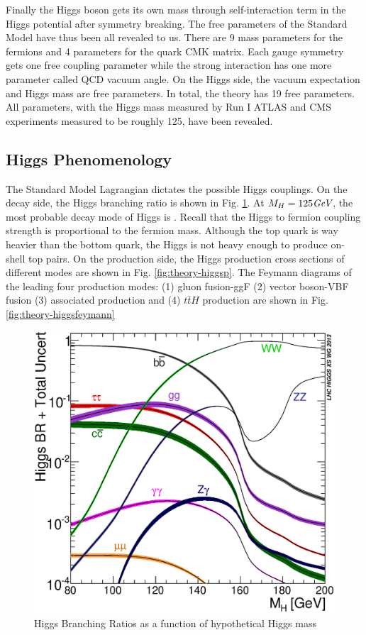Finally the Higgs boson gets its own mass through self-interaction term in the Higgs potential after symmetry breaking. The free parameters of the Standard Model have thus been all revealed to us. There are 9 mass parameters for the fermions and 4 parameters for the quark CMK matrix. Each gauge symmetry gets one free coupling parameter while the strong interaction has one more parameter called QCD vacuum angle. On the Higgs side, the vacuum expectation and Higgs mass are free parameters. In total, the theory has 19 free parameters. All parameters, with the Higgs mass measured by Run I ATLAS and CMS experiments measured to be roughly 125\GeV, have been revealed. 


\subsection{Higgs Phenomenology}

The Standard Model Lagrangian dictates the possible Higgs couplings. On the decay side, the Higgs branching ratio is shown in Fig. \ref{fig:theory-higgsbr}. At $M_H = 125\textit{GeV}$, the most probable decay mode of Higgs is \Hbb. Recall that the Higgs to fermion coupling strength is proportional to the fermion mass. Although the top quark is way heavier than the bottom quark, the Higgs is not heavy enough to produce on-shell top pairs. On the production side, the Higgs production cross sections of different modes are shown in Fig. \ref{fig:theory-higgsp}. The Feymann diagrams of the leading four production modes: (1) gluon fusion-ggF (2) vector boson-VBF fusion (3) associated production and (4) $t\bar{t} H$ production are shown in Fig. \ref{fig:theory-higgsfeymann}


\begin{figure}[htpb!]
\begin{center}
  \includegraphics[width=0.45\linewidth]{figures/theory/Higgs_BR_LM.eps}
\caption{Higgs Branching Ratios as a function of hypothetical Higgs mass \cite{CERN-YELLOW-BOOK}}
\label{fig:theory-higgsbr}
\end{center}
\end{figure}

